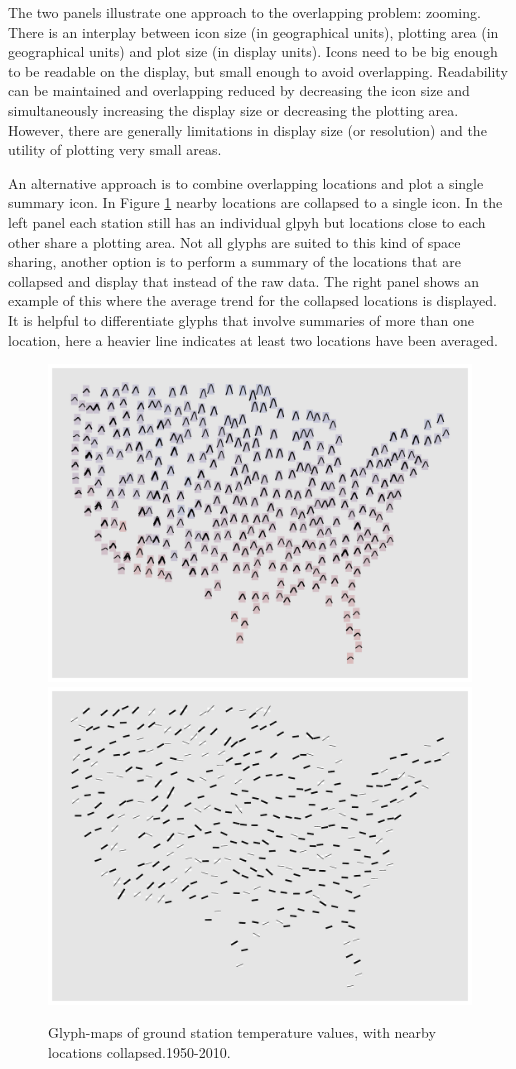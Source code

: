 \documentclass[oneside]{article}
\begin{document}
The two panels illustrate one approach to the overlapping problem: zooming.  There is an interplay between icon size (in geographical units), plotting area (in geographical units) and plot size (in display units).  Icons need to be big enough to be readable on the display, but small enough to avoid overlapping.  Readability can be maintained and overlapping reduced by decreasing the icon size and simultaneously increasing the display size or decreasing the plotting area.  However, there are generally limitations in display size (or resolution) and the utility of plotting very small areas.  

An alternative approach is to combine overlapping locations and plot a single summary icon.  In Figure \ref{fig:irregular-collapsed} nearby locations are collapsed to a single icon.  In the left panel each station still has an individual glpyh but locations close to each other share a plotting area.  Not all glyphs are suited to this kind of space sharing, another option is to perform a summary of the locations that are collapsed and display that instead of the raw data.  The right panel shows an example of this where the average trend for the collapsed locations is displayed.  It is helpful to differentiate glyphs that involve summaries of more than one location, here a heavier line indicates at least two locations have been averaged.

\begin{figure}[htbp]
  \centering
  \includegraphics[width=0.5\linewidth]{usa-season-collapsed}%
  \includegraphics[width=0.5\linewidth]{usa-lin-collapse}%
  \caption{Glyph-maps of ground station temperature values, with nearby locations collapsed.1950-2010.}
  \label{fig:irregular-collapsed}
\end{figure}
\end{document}
